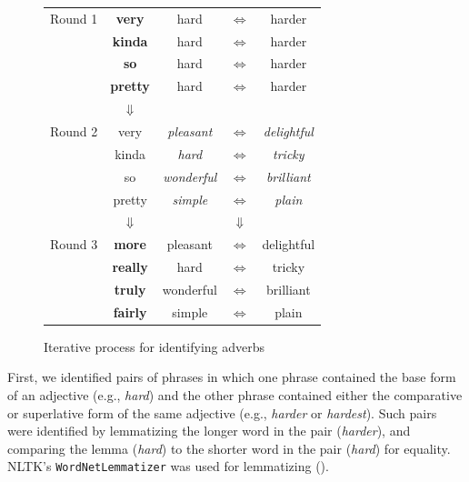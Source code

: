 \documentclass[11pt,a4paper]{article}
\begin{document}
\begin{figure}[t]
	\begin{center}
	\begin{tabular}{ c | c c c c | }
		\cline{2-5}
 		Round 1 & \textbf{very} & hard & $\Leftrightarrow$ & harder \\ 
 		& \textbf{kinda} & hard & $\Leftrightarrow$ & harder \\  
 		& \textbf{so} & hard & $\Leftrightarrow$ & harder \\
		& \textbf{pretty} & hard & $\Leftrightarrow$ & harder \\  
		\cline{2-5}
		
		\multicolumn{1}{c}{} & $\Downarrow$ & & & \multicolumn{1}{r}{} \\ 
		
		\cline{2-5}
 		Round 2 & very & \textit{pleasant} & $\Leftrightarrow$ & \textit{delightful} \\ 
 		& kinda & \textit{hard} & $\Leftrightarrow$ & \textit{tricky} \\  
 		& so & \textit{wonderful} & $\Leftrightarrow$ & \textit{brilliant} \\
		& pretty & \textit{simple} & $\Leftrightarrow$ & \textit{plain} \\
		\cline{2-5}
		
		\multicolumn{1}{r}{} & $\Downarrow$ & & \multicolumn{1}{c}{$\Downarrow$} \\
		
		\cline{2-5}
 		Round 3 & \textbf{more} & pleasant & $\Leftrightarrow$ & delightful \\ 
 		& \textbf{really} & hard & $\Leftrightarrow$ & tricky \\  
 		& \textbf{truly} & wonderful & $\Leftrightarrow$ & brilliant \\
		& \textbf{fairly} & simple & $\Leftrightarrow$ & plain \\
		\cline{2-5}
	\end{tabular}
	\end{center}
	\caption{Iterative process for identifying adverbs}
\end{figure}

First, we identified pairs of phrases in which one phrase contained the base form of an adjective (e.g., \textit{hard}) and the other phrase contained either the comparative or superlative form of the same adjective (e.g., \textit{harder} or \textit{hardest}). Such pairs were identified by lemmatizing the longer word in the pair (\textit{harder}), and comparing the lemma (\textit{hard}) to the shorter word in the pair (\textit{hard}) for equality. NLTK's \texttt{WordNetLemmatizer} was used for lemmatizing (). 
\end{document}
